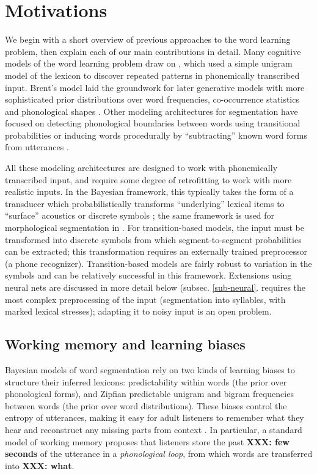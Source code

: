 \documentclass[11pt,letterpaper]{article}
\newcommand{\xxx}[1]{\textbf{\color{red}XXX: #1}}
\begin{document}
\section{Motivations}

We begin with a short overview of previous approaches to the word
learning problem, then explain each of our main contributions in
detail. Many cognitive models of the word learning problem draw on
, which used a simple unigram model of the lexicon to
discover repeated patterns in phonemically transcribed input. Brent's
model laid the groundwork for later generative models with more
sophisticated prior distributions over word frequencies, co-occurrence
statistics and phonological shapes \cite{xxx}. Other modeling
architectures for segmentation have focused on detecting phonological
boundaries between words using transitional probabilities \cite{xxx}
or inducing words procedurally by ``subtracting'' known word forms
from utterances \cite{Lignos}.

All these modeling architectures are designed to work with
phonemically transcribed input, and require some degree of
retrofitting to work with more realistic inputs. In the Bayesian
framework, this typically takes the form of a transducer which
probabilistically transforms ``underlying'' lexical items to
``surface'' acoustics \cite{Lee15} or discrete symbols
\cite{Elsner13}; the same framework is used for morphological
segmentation in . For transition-based models,
the input must be transformed into discrete symbols from which
segment-to-segment probabilities can be extracted; this transformation
requires an externally trained preprocessor (a phone
recognizer). Transition-based models are fairly robust to variation in
the symbols \cite{Rytting,Daland,Fleck} and can be relatively
successful in this framework. Extensions using neural nets
\cite{Christiansen,Rytting} are discussed in more detail below
(subsec. \ref{sub-neural}.  requires the most complex
preprocessing of the input (segmentation into syllables, with marked
lexical stresses); adapting it to noisy input is an open problem.

\subsection{Working memory and learning biases}

Bayesian models of word segmentation rely on two kinds of learning
biases to structure their inferred lexicons: predictability within
words (the prior over phonological forms), and Zipfian predictable
unigram and bigram frequencies between words (the prior over word
distributions). These biases control the entropy of utterances, making
it easy for adult listeners to remember what they hear and reconstruct
any missing parts from context \cite{xxx}. In particular, a standard
model of working memory \cite{Baddeley} proposes that listeners store
the past \xxx{few seconds} of the utterance in a \textit{phonological
  loop}, from which words are transferred into \xxx{what}.
\end{document}
